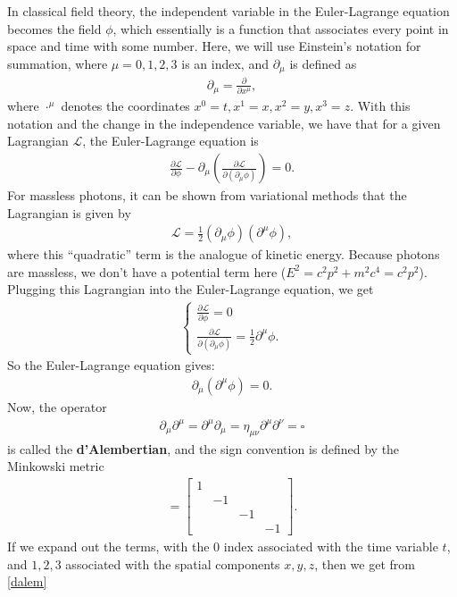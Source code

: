 \documentclass{article}
\newcommand{\p}{\partial}
\newcommand{\lag}{\mathcal{L}}
\newcommand{\f}[2]{\frac{#1}{#2}}
\begin{document}
In classical field theory, the independent variable in the Euler-Lagrange equation becomes the field $\phi$, which essentially is a function that associates every point in space and time with some number. Here, we will use Einstein's notation for summation, where $\mu = 0,1,2,3$ is an index, and $\p_\mu$ is defined as
\begin{align}
\p_\mu = \f{\p}{\p x^\mu},
\end{align}
where $\cdot^\mu$ denotes the coordinates $x^0 = t, x^1 = x, x^2 = y, x^3 = z$. With this notation and the change in the independence variable, we have that for a given Lagrangian $\lag$, the Euler-Lagrange equation is 
\begin{align}
\frac{\p \lag}{\p \phi} - \p_\mu\left( \frac{\p \lag}{\p(\p_\mu \phi)} \right) = 0.
\end{align}
For massless photons, it can be shown from variational methods that the Lagrangian is given by
\begin{align}
\lag = \frac{1}{2}(\p_\mu\phi)(\p^\mu\phi),
\end{align}
where this ``quadratic'' term is the analogue of kinetic energy. Because photons are massless, we don't have a potential term here ($E^2 = c^2p^2 + m^2c^4 = c^2p^2$). Plugging this Lagrangian into the Euler-Lagrange equation, we get
\begin{align}
\begin{cases}
\frac{\p\lag}{\p\phi} = 0\\
\frac{\p\lag}{\p(\p_\mu\phi)} = \f{1}{2}\p^\mu\phi.
\end{cases}
\end{align}
So the Euler-Lagrange equation gives:
\begin{align}\label{dalem}
\p_\mu(\p^\mu\phi) = 0.
\end{align}
Now, the operator  
\begin{align}
\p_\mu \p^\mu = \p^\mu\p_\mu = \eta_{\mu\nu}\p^\mu\p^\nu = \square
\end{align}
is called the \textbf{d'Alembertian}, and the sign convention is defined by the Minkowski metric
\begin{align}
[\eta_{\mu\nu}] = \begin{bmatrix}
1&&&\\
&-1&&\\
&&-1&\\
&&&-1
\end{bmatrix}.
\end{align}
If we expand out the terms, with the 0 index associated with the time variable $t$, and $1,2,3$ associated with the spatial components $x,y,z$, then we get from \eqref{dalem}
\end{document}
